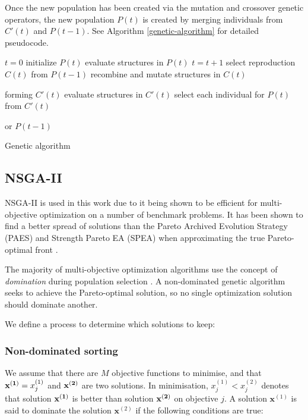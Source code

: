 \documentclass[10pt, conference, compsocconf]{IEEEtran}
\begin{document}
Once the new population has been created via the mutation and crossover genetic operators, the new population $P(t)$ is created by merging individuals from $C'(t)$ and $P(t-1)$. See Algorithm \ref{genetic-algorithm} for detailed pseudocode.

\begin{algorithm}[t]
\begin{algorithmic}[1]
\State $t=0$
\State initialize $P(t)$
\State evaluate structures in $P(t)$
\State $t=t+1$
\State select reproduction $C(t)$ from $P(t-1)$
\State recombine and mutate structures in $C(t)$

forming $C'(t)$
\State evaluate structures in $C'(t)$
\State select each individual for $P(t)$ from $C'(t)$ 

or $P(t-1)$
\EndWhile
\caption{Genetic algorithm \cite{FogelDavidB2009}}
\label{genetic-algorithm}
\end{algorithmic}
\end{algorithm}

\subsection{NSGA-II}

NSGA-II is used in this work due to it being shown to be efficient for multi-objective optimization on a number of benchmark problems. It has been shown to find a better spread of solutions than the Pareto Archived Evolution Strategy (PAES) \cite{Knowles1999} and Strength Pareto EA (SPEA) \cite{Zitzler2006} when approximating the true Pareto-optimal front \cite{Valkanas2014}.

The majority of multi-objective optimization algorithms use the concept of \emph{domination} during population selection \cite{Burke2014}. A non-dominated genetic algorithm seeks to achieve the Pareto-optimal solution, so no single optimization solution should dominate another.

We define a process to determine which solutions to keep:

\subsubsection{Non-dominated sorting}
We assume that there are $M$ objective functions to minimise, and that ${\bf x^{(1)}} = x_j^{(1)}$ and $\bf x^{(2)}$ are two solutions. In minimisation, $x_j^{(1)}<x_j^{(2)}$ denotes that solution $\bf x^{(1)}$ is better than solution $\bf x^{(2)}$ on objective $j$. A solution $\mathbf{x}^{(1)}$ is said to dominate the solution $\mathbf{x}^{(2)}$ if the following conditions are true:
\end{document}
